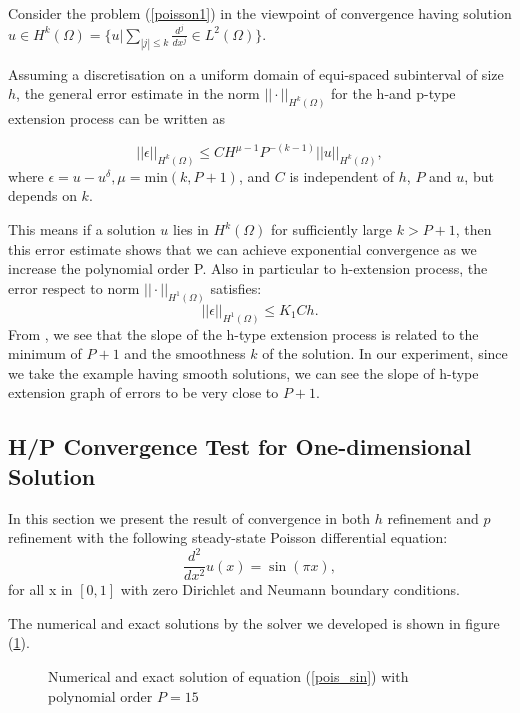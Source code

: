 
Consider the problem (\ref{poisson1}) in the viewpoint of convergence having solution $u \in H^k(\Omega)= \{u|\sum_{|j|\le k }\frac{d^j}{dx^j} \in L^2(\Omega) \}$.

Assuming a discretisation on a uniform domain of equi-spaced subinterval of size $h$, the general error estimate in the norm $||\cdot||_{H^k(\Omega)}$ for the h-and p-type extension process can be written as \cite{Karniadarkis}

\begin{equation}
\label{hprelation}
||\epsilon||_{H^k(\Omega)} \le CH^{\mu-1}P^{-(k-1)}||u||_{H^k(\Omega)},
\end{equation}
where $\epsilon = u - u^{\delta}, \mu = \mbox{min}(k, P+1)$, and $C$ is independent of $h$, $P$ and $u$, but depends on $k$.

This means if a solution $u$ lies in  $H^k(\Omega)$ for sufficiently large $k > P+1$, then this error estimate shows that we can achieve exponential convergence as we increase the polynomial order P. Also in particular to h-extension process, the error respect to norm $||\cdot||_{H^1(\Omega)}$ satisfies:
\begin{equation}
\label{hrelation} ||\epsilon||_{H^1(\Omega)} \le K_1Ch.
\end{equation}
From \cite{Karniadarkis}, we see that the slope of the h-type extension process is related to the minimum of $P+1$ and the smoothness $k$ of the solution. In our experiment, since we take the example having smooth solutions, we can see the slope of h-type extension graph of errors to be very close to $P+1$.

\subsection {H/P Convergence Test for One-dimensional Solution}

In this section we present the result of convergence in both $h$ refinement and $p$ refinement with the following steady-state Poisson differential equation:
\begin{equation}
\label{pois_sin}
\frac{d^2}{dx^2} u(x) = \sin(\pi x),
\end{equation}
for all x in $[0, 1]$ with zero Dirichlet and Neumann boundary conditions.

The numerical and exact solutions by the solver we developed is shown in figure (\ref{sinsol}).

\begin{figure}[h]
    \begin{center}
    \caption{\label{sinsol}Numerical and exact solution of equation (\ref{pois_sin}) with polynomial order $P=15$}
    \end{center}
\end{figure}

